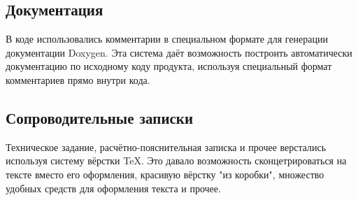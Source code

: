 \documentclass[a4paper,12pt]{report}
\begin{document}
\subsection{Документация}
В коде использовались комментарии в специальном формате для генерации документации Doxygen. Эта система даёт возможность построить автоматически документацию по исходному коду продукта, используя специальный формат комментариев прямо внутри кода.

\subsection{Сопроводительные записки}
Техническое задание, расчётно-пояснительная записка и прочее верстались используя систему вёрстки TeX. Это давало возможность сконцетрироваться на тексте вместо его оформления, красивую вёрстку "из коробки", множество удобных средств для оформления текста и прочее.
\end{document}
